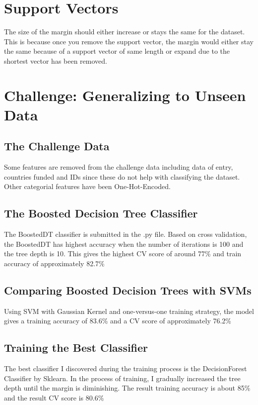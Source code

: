 \documentclass{article}
\begin{document}
   \section{Support Vectors}
  	The size of the margin should either increase or stays the same for the dataset. This is because once you remove the support vector, the margin would either stay the same because of a support vector of same length or expand due to the shortest vector has been removed.
   \section{Challenge: Generalizing to Unseen Data}
   \subsection{The Challenge Data}
   Some features are removed from the challenge data including data of entry, countries funded and IDs since these do not help with classifying the dataset. Other categorial features have been One-Hot-Encoded.
   \subsection{The Boosted Decision Tree Classifier}
   The BoostedDT classifier is submitted in the .py file. Based on cross validation, the BoostedDT has highest accuracy when the number of iterations is 100 and the tree depth is 10. This gives the highest CV score of around 77\% and train accuracy of approximately 82.7\%
   \subsection{Comparing Boosted Decision Trees with SVMs}
   Using SVM with Gaussian Kernel and one-versus-one training strategy, the model gives a training accuracy of 83.6\% and a CV score of approximately 76.2\%
   \subsection{Training the Best Classifier}
   The best classifier I discovered during the training process is the DecisionForest Classifier by Sklearn. In the process of training, I gradually increased the tree depth until the margin is diminishing. The result training accuracy is about 85\% and the result CV score is 80.6\%
\end{document}

